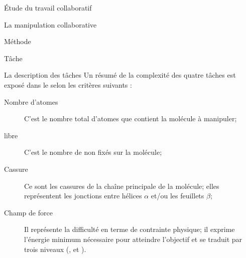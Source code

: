 \documentclass[myfrancais]{mythesis}
\begin{document}
\begin{mypart}{Étude du travail collaboratif}
\begin{mychapter}{La manipulation collaborative}
\begin{mysection}{Méthode}
\begin{mysubsection}{Tâche}
\begin{mysubsubsection}{La description des tâches}
						Un résumé de la complexité des quatre tâches est exposé dans le  selon les critères suivants :
						\begin{description}
							\item[Nombre d'atomes] C'est le nombre total d'atomes que contient la molécule à manipuler;
							\item[ libre] C'est le nombre de  non fixés sur la molécule;
							\item[Cassure] Ce sont les cassures de la chaîne principale de la molécule; elles représentent les jonctions entre hélices $\alpha$ et/ou les feuillets $\beta$;
							\item[Champ de force] Il représente la difficulté en terme de contrainte physique; il exprime l'énergie minimum nécessaire pour atteindre l'objectif et se traduit par trois niveaux (,  et ).
						\end{description}


\end{mysubsubsection}
\end{mysubsection}
\end{mysection}
\end{mychapter}
\end{mypart}
\end{document}
